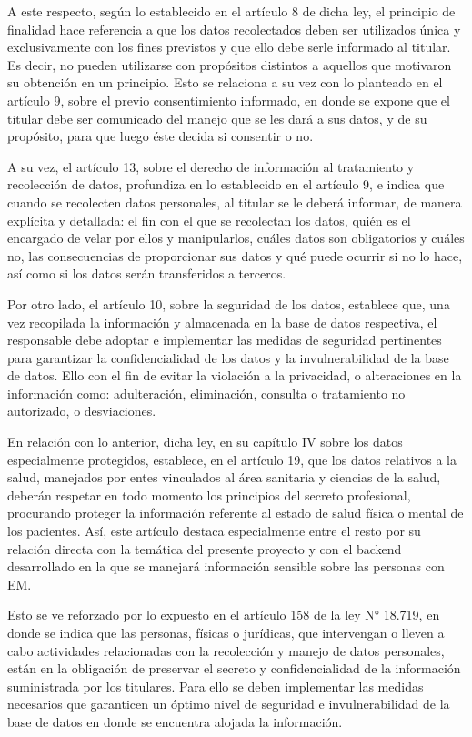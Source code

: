 A este respecto, según lo establecido en el artículo 8 de dicha ley, el principio de finalidad hace referencia a que los datos recolectados deben ser utilizados única y exclusivamente con los fines previstos y que ello debe serle informado al titular. Es decir, no pueden utilizarse con propósitos distintos a aquellos que motivaron su obtención en un principio. Esto se relaciona a su vez con lo planteado en el artículo 9, sobre el previo consentimiento informado, en donde se expone que el titular debe ser comunicado del manejo que se les dará a sus datos, y de su propósito, para que luego éste decida si consentir o no.

A su vez, el artículo 13, sobre el derecho de información al tratamiento y recolección de datos, profundiza en lo establecido en el artículo 9, e indica que cuando se recolecten datos personales, al titular se le deberá informar, de manera explícita y detallada: el fin con el que se recolectan los datos, quién es el encargado de velar por ellos y manipularlos, cuáles datos son obligatorios y cuáles no, las consecuencias de proporcionar sus datos y qué puede ocurrir si no lo hace, así como si los datos serán transferidos a terceros.

Por otro lado, el artículo 10, sobre la seguridad de los datos, establece que, una vez recopilada la información y almacenada en la base de datos respectiva, el responsable debe adoptar e implementar las medidas de seguridad pertinentes para garantizar la confidencialidad de los datos y la invulnerabilidad de la base de datos. Ello con el fin de evitar la violación a la privacidad, o alteraciones en la información como: adulteración, eliminación, consulta o tratamiento no autorizado, o desviaciones.

En relación con lo anterior, dicha ley, en su capítulo IV sobre los datos especialmente protegidos, establece, en el artículo 19, que los datos relativos a la salud, manejados por entes vinculados al área sanitaria y ciencias de la salud, deberán respetar en todo momento los principios del secreto profesional, procurando proteger la información referente al estado de salud física o mental de los pacientes. Así, este artículo destaca especialmente entre el resto por su relación directa con la temática del presente proyecto y con el backend desarrollado en la que se manejará información sensible sobre las personas con EM.

Esto se ve reforzado por lo expuesto en el artículo 158 de la ley N° 18.719, en donde se indica que las personas, físicas o jurídicas, que intervengan o lleven a cabo actividades relacionadas con la recolección y manejo de datos personales, están en la obligación de preservar el secreto y confidencialidad de la información suministrada por los titulares. Para ello se deben implementar las medidas necesarios que garanticen un óptimo nivel de seguridad e invulnerabilidad de la base de datos en donde se encuentra alojada la información.

